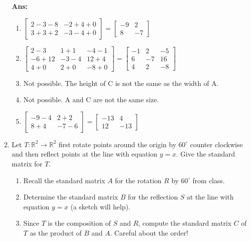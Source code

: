 \documentclass[12pt,a4paper]{amsart}
\newcommand{\R}{\mathbb{R}}
\newcommand\sol[1]{
\medskip
\begin{mdframed}
\textbf{Ans:\\} #1
\end{mdframed}
\medskip
}
\begin{document}
\begin{enumerate}
\sol{
  \begin{enumerate}
    \item
      $\left[ \begin{array}{cc} 2-3-8 & -2+4+0 \\ 3+3+2 & -3-4+0 \end{array} \right]=\left[ \begin{array}{cc} -9 & 2 \\ 8 & -7 \end{array} \right]$
    \item
    $\left[ \begin{array}{ccc} 2-3 & 1+1 & -4-1 \\ -6+12 & -3-4 & 12+4 \\ 4+0 & 2+0 & -8+0 \end{array} \right] = \left[ \begin{array}{ccc} -1 & 2 & -5 \\ 6 & -7 & 16 \\ 4 & 2 & -8 \end{array} \right]$
    \item
      Not possible. The height of C is not the same as the width of A.
    \item
      Not possible. A and C are not the same size.
    \item
      $\left[ \begin{array}{cc} -9-4 & 2+2 \\ 8+4 & -7-6 \end{array} \right]=\left[ \begin{array}{cc} -13 & 4 \\ 12 & -13 \end{array} \right]$
  \end{enumerate}
}

\item
 Let $T\colon\R^2\to\R^2$ first rotate points around the origin by $60^\circ$ counter clockwise and then reflect
 points at the line with equation $y=x$. Give the standard matrix for $T$.

\begin{enumerate}
\item Recall the standard matrix $A$ for the rotation $R$ by  $60^\circ$ from class.  
\item  Determine the standard matrix $B$ for the reflection $S$ at the line with equation $y=x$ (a sketch will help).
\item Since $T$ is the composition of $S$ and $R$, compute the standard matrix $C$ of $T$ as the product of $B$ and $A$.
  Careful about the order!
\end{enumerate}


\end{enumerate}
\end{document}
